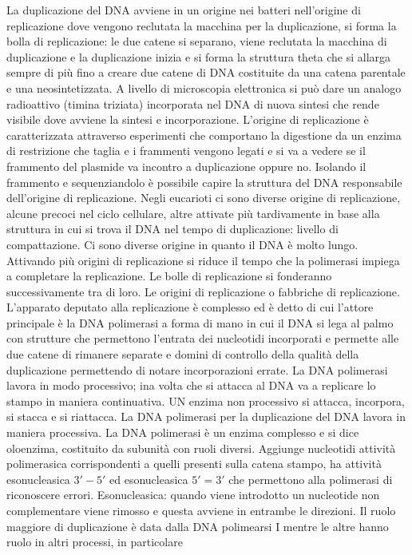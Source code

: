 La duplicazione del DNA avviene in un origine nei batteri nell'origine di replicazione dove vengono reclutata la macchina per la duplicazione, si forma la bolla di replicazione: 
le due catene si separano, viene reclutata la macchina di duplicazione e la duplicazione inizia e si forma la struttura theta che si allarga sempre di pi\`u fino a creare due catene
di DNA costituite da una catena parentale e una neosintetizzata. A livello di microscopia elettronica si pu\`o dare un analogo radioattivo (timina triziata) incorporata nel DNA di nuova
sintesi che rende visibile dove avviene la sintesi e incorporazione. L'origine di replicazione \`e caratterizzata attraverso esperimenti che comportano la digestione da un enzima di 
restrizione che taglia e i frammenti vengono legati e si va a vedere se il frammento del plasmide va incontro a duplicazione oppure no. Isolando il frammento e sequenziandolo \`e 
possibile capire la struttura del DNA responsabile dell'origine di replicazione. Negli eucarioti ci sono diverse origine di replicazione, alcune precoci nel ciclo cellulare, altre
attivate pi\`u tardivamente in  base alla struttura in cui si trova il DNA nel tempo di duplicazione: livello di compattazione. Ci sono diverse origine in quanto il DNA \`e molto lungo.
Attivando pi\`u origini di replicazione si riduce il tempo che la polimerasi impiega a completare la replicazione. Le bolle di replicazione si fonderanno successivamente tra di loro.
Le origini di replicazione o fabbriche di replicazione. L'apparato deputato alla replicazione \`e complesso ed \`e detto di cui l'attore principale \`e la DNA polimerasi a forma di mano
in cui il DNA si lega al palmo con strutture che permettono l'entrata dei nucleotidi incorporati e permette alle due catene di rimanere separate e domini di controllo della qualit\`a 
della duplicazione permettendo di notare incorporazioni errate. La DNA polimerasi lavora in modo processivo; ina volta che si attacca al DNA va a replicare lo stampo in maniera 
continuativa. UN enzima non processivo si attacca, incorpora, si stacca e si riattacca. La DNA polimerasi per la duplicazione del DNA lavora in maniera processiva. La DNA polimerasi 
\`e un enzima complesso e si dice oloenzima, costituito da subunit\`a con ruoli diversi. Aggiunge nucleotidi attivit\`a polimerasica corrispondenti a quelli presenti sulla catena stampo, 
ha attivit\`a esonucleasica $3'- 5'$ ed esonucleasica $5'=3'$ che permettono alla polimerasi di riconoscere errori. Esonucleasica: quando viene introdotto un nucleotide non complementare
viene rimosso e questa avviene in entrambe le direzioni. Il ruolo maggiore di duplicazione \`e data dalla DNA polimearsi I mentre le altre hanno ruolo in altri processi, in particolare 

